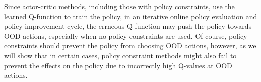 Since actor-critic methods, including those with policy constraints, use the learned Q-function to train the policy, in an iterative online policy evaluation and policy improvement cycle, the errneous Q-function may push the policy towards OOD actions, especially when no policy constraints are used. Of course, policy constraints should prevent the policy from choosing OOD actions, however, as we will show that in certain cases, policy constraint methods might also fail to prevent the effects on the policy due to incorrectly high Q-values at OOD actions. 



